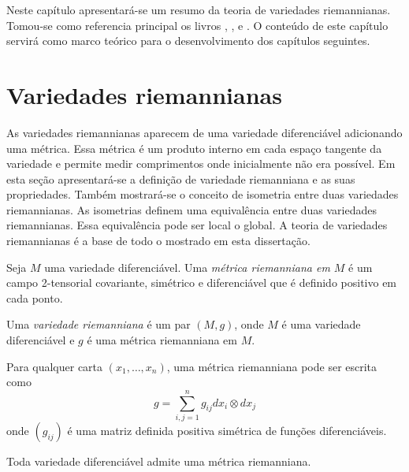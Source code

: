 Neste capítulo apresentará-se um resumo da teoria de variedades riemannianas.
Tomou-se como referencia principal os livros \cite{Lee2012}, \cite{Lee1997}, \cite{Carmo1988} e \cite{Gallot2004}.
O conteúdo de este capítulo servirá como marco teórico para o desenvolvimento dos capítulos seguintes.

\section{Variedades riemannianas}

As variedades riemannianas aparecem de uma variedade diferenciável adicionando uma métrica.
Essa métrica é um produto interno em cada espaço tangente da variedade e permite medir comprimentos onde inicialmente não era possível.
Em esta seção apresentará-se a definição de variedade riemanniana e as suas propriedades.
Também mostrará-se o conceito de isometria entre duas variedades riemannianas.
As isometrias definem uma equivalência entre duas variedades riemannianas.
Essa equivalência pode ser local o global.
A teoria de variedades riemannianas é a base de todo o mostrado em esta dissertação.

\begin{definicao}
	Seja $M$ uma variedade diferenciável. Uma \emph{métrica riemanniana em $M$} é um campo 2-tensorial covariante, simétrico e diferenciável que é definido positivo em cada ponto.	
\end{definicao}

\begin{definicao}
	Uma \emph{variedade riemanniana} é um par $(M,g)$, onde $M$ é uma variedade diferenciável e $g$ é uma métrica riemanniana em $M$.
\end{definicao}

\begin{observacao}
	Para qualquer carta $(x_1, \ldots, x_n)$, uma métrica riemanniana pode ser escrita como
	\begin{equation*}
		g = \sum_{i,j=1}^n g_{ij} dx_i \otimes dx_j
	\end{equation*}
	onde $(g_{ij})$ é uma matriz definida positiva simétrica de funções diferenciáveis.
\end{observacao}

\begin{proposicao}
Toda variedade diferenciável admite uma métrica riemanniana.
\end{proposicao}


